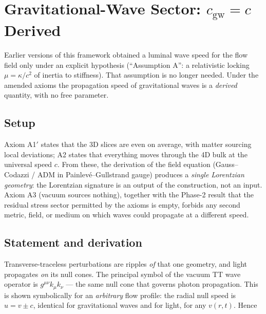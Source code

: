 
\section{Gravitational-Wave Sector: $c_\text{gw} = c$ Derived}
\label{sec:gwsector}

Earlier versions of this framework obtained a luminal wave speed for the flow
field only under an explicit hypothesis (``Assumption A'': a relativistic locking
$\mu = \kappa/c^2$ of inertia to stiffness). That assumption is no longer needed.
Under the amended axioms the propagation speed of gravitational waves is a
\emph{derived} quantity, with no free parameter.

\subsection{Setup}

Axiom A1$'$ states that the 3D slices are even on average, with matter sourcing
local deviations; A2 states that everything moves through the 4D bulk at the
universal speed $c$. From these, the derivation of the field equation
(Gauss--Codazzi / ADM in Painlev\'e--Gullstrand gauge) produces a \emph{single
Lorentzian geometry}: the Lorentzian signature is an output of the construction,
not an input. Axiom A3 (vacuum sources nothing), together with the Phase-2
result that the residual stress sector permitted by the axioms is empty, forbids
any second metric, field, or medium on which waves could propagate at a
different speed.

\subsection{Statement and derivation}

Transverse-traceless perturbations are ripples \emph{of} that one geometry, and
light propagates \emph{on} its null cones. The principal symbol of the vacuum TT
wave operator is $g^{\mu\nu}k_\mu k_\nu$ --- the same null cone that governs
photon propagation. This is shown symbolically for an \emph{arbitrary} flow
profile: the radial null speed is $u = v \pm c$, identical for gravitational
waves and for light, for any $v(r,t)$. Hence

